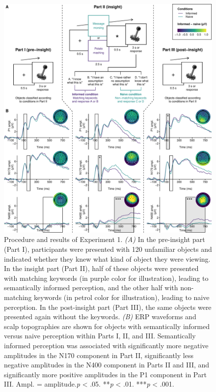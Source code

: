 \documentclass[
  english,
  man,11pt,floatsintext]{apa7}
\begin{document}
\begin{figure}

{\centering \includegraphics[width=1\linewidth]{manuscript_files/figure-latex/exp1-plot-1} 

}

\caption{Procedure and results of Experiment 1. \emph{(A)} In the pre-insight part (Part I), participants were presented with 120 unfamiliar objects and indicated whether they knew what kind of object they were viewing. In the insight part (Part II), half of these objects were presented with matching keywords (in purple color for illustration), leading to semantically informed perception, and the other half with non-matching keywords (in petrol color for illustration), leading to naive perception. In the post-insight part (Part III), the same objects were presented again without the keywords. \emph{(B)} ERP waveforms and scalp topographies are shown for objects with semantically informed versus naive perception within Parts I, II, and III. Semantically informed perception was associated with significantly more negative amplitudes in the N170 component in Part II, significantly less negative amplitudes in the N400 component in Parts II and III, and significantly more positive amplitudes in the P1 component in Part III. Ampl. = amplitude.\newline*\emph{p} \textless{} .05. **\emph{p} \textless{} .01. ***\emph{p} \textless{} .001.}\label{fig:exp1-plot}
\end{figure}
\end{document}
